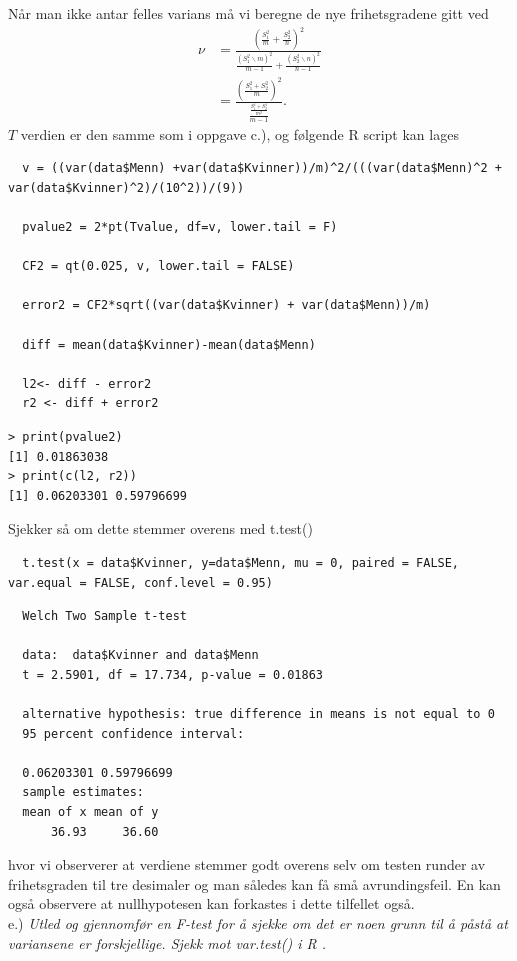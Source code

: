 \documentclass[12pt,
               a4paper,
               article,
               oneside,
               oldfontcommands,
               norsk]{memoir}
\begin{document}
Når man ikke antar felles varians må vi beregne de nye frihetsgradene gitt ved  
\begin{align*}
\nu &= \frac{\left(\frac{S_{1}^{2}}{m} + \frac{S_{2}^2}{n} \right)^2}{\frac{\left(S_{1}^2 \backslash m \right)^2}{m-1} + {\frac{\left(S_{2}^2 \backslash n \right)^2}{n-1}}} \\[7pt] 
 &= \frac{\left(\frac{S_{1}^2 + S_{2}^2}{m} \right)^2}{\frac{\frac{S_{1}^4 + S_{2}^4}{m^2}}{m-1}}.
\end{align*}
$T$ verdien er den samme som i oppgave c.), og følgende R script kan lages 
\begin{lstlisting}
  v = ((var(data$Menn) +var(data$Kvinner))/m)^2/(((var(data$Menn)^2 + var(data$Kvinner)^2)/(10^2))/(9))

  pvalue2 = 2*pt(Tvalue, df=v, lower.tail = F)

  CF2 = qt(0.025, v, lower.tail = FALSE)

  error2 = CF2*sqrt((var(data$Kvinner) + var(data$Menn))/m)

  diff = mean(data$Kvinner)-mean(data$Menn)

  l2<- diff - error2
  r2 <- diff + error2
\end{lstlisting}
\begin{verbatim}
> print(pvalue2)
[1] 0.01863038
> print(c(l2, r2))
[1] 0.06203301 0.59796699
\end{verbatim}
Sjekker så om dette stemmer overens med t.test()
\begin{lstlisting}
  t.test(x = data$Kvinner, y=data$Menn, mu = 0, paired = FALSE, var.equal = FALSE, conf.level = 0.95)
\end{lstlisting}
\begin{verbatim}
  Welch Two Sample t-test

  data:  data$Kvinner and data$Menn
  t = 2.5901, df = 17.734, p-value = 0.01863

  alternative hypothesis: true difference in means is not equal to 0
  95 percent confidence interval:

  0.06203301 0.59796699
  sample estimates:
  mean of x mean of y 
      36.93     36.60 
\end{verbatim}
hvor vi observerer at verdiene stemmer godt overens selv om testen runder av frihetsgraden til tre desimaler og man således kan få små avrundingsfeil. En kan også observere at nullhypotesen kan forkastes i dette tilfellet også. \vspace{4mm}\\ 
e.) \emph{Utled og gjennomfør en F-test for å sjekke om det er noen grunn til å påstå at variansene er forskjellige. Sjekk mot var.test() i R .}\vspace{4mm}\\ 
\end{document}
